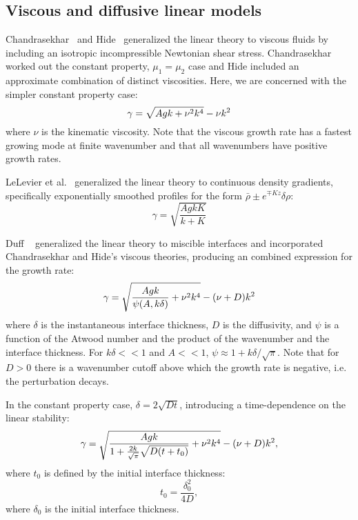\subsection{Viscous and diffusive linear models}
Chandrasekhar~\cite{Chandrasekhar1955} and Hide~\cite{Hide1955} generalized the linear theory to viscous fluids by including an isotropic incompressible Newtonian shear stress.
Chandrasekhar worked out the constant property, $\mu_1 = \mu_2$ case and Hide included an approximate combination of distinct viscosities.
Here, we are concerned with the simpler constant property case:
\begin{equation} \elabel{visc_growth}
  \gamma = \sqrt{A g k + \nu^2 k^4} - \nu k^2
\end{equation} 
where 
$\nu$ is the kinematic viscosity.
Note that the viscous growth rate has a fastest growing mode at finite wavenumber and that all wavenumbers have positive growth rates.

LeLevier et al.~\cite{LeLevier1955} generalized the linear theory to continuous density gradients, specifically exponentially smoothed profiles for the form $\bar\rho \pm e^{\mp K z} \delta\rho$:
\begin{equation}
\gamma = \sqrt{\frac{A g k K}{k + K}}
\end{equation}

Duff \etal~\cite{Duff1962} generalized the linear theory to miscible interfaces and incorporated Chandrasekhar and Hide's viscous theories, producing an combined expression for the growth rate:
\begin{equation} \elabel{duff_simple}
\gamma = \sqrt{\frac{A g k}{\psi(A,k\delta)} + \nu^2 k^4} - (\nu + D) k^2
\end{equation}
where 
$\delta$ is the instantaneous interface thickness,
$D$ is the diffusivity,
and $\psi$ is a function of the Atwood number and the product of the wavenumber and the interface thickness.
For $k \delta << 1$ and $A << 1$, $\psi \approx 1 + k \delta / \sqrt{\pi}$.
Note that for $D > 0$ there is a wavenumber cutoff above which the growth rate is negative, i.e. the perturbation decays.

In the constant property case, $\delta = 2 \sqrt{D t}$, introducing a time-dependence on the linear stability:
\begin{equation} \elabel{duff_growth}
\gamma = \sqrt{\frac{A g k}{1 + \frac{2 k}{\sqrt{\pi}}\sqrt{D (t+t_0)} } + \nu^2 k^4} - (\nu + D) k^2,
\end{equation}
where $t_0$ is defined by the initial interface thickness:
\begin{equation}
t_0 = \frac{\delta_0^2}{4 D},
\end{equation}
where $\delta_0$ is the initial interface thickness.

